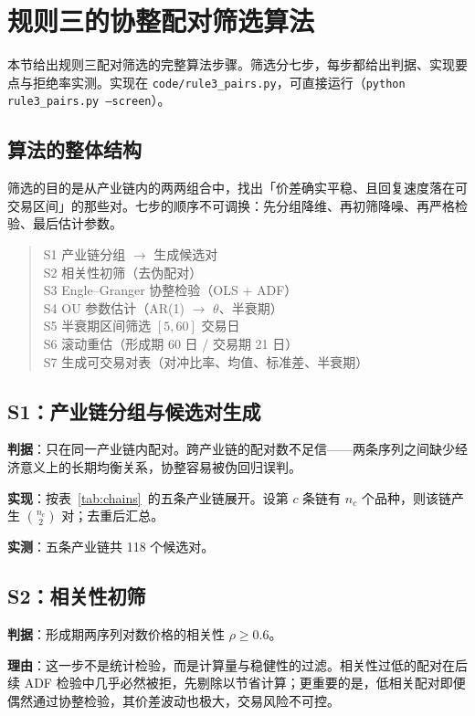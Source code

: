 \section{规则三的协整配对筛选算法}\label{sec:pairalgo}

本节给出规则三配对筛选的完整算法步骤。筛选分七步，每步都给出判据、实现要点与拒绝率实测。实现在 \texttt{code/rule3\_pairs.py}，可直接运行（\texttt{python rule3\_pairs.py --screen}）。

\subsection{算法的整体结构}

筛选的目的是从产业链内的两两组合中，找出「价差确实平稳、且回复速度落在可交易区间」的那些对。七步的顺序不可调换：先分组降维、再初筛降噪、再严格检验、最后估计参数。

\begin{quote}\ttfamily\small
S1 产业链分组 $\to$ 生成候选对\\
S2 相关性初筛（去伪配对）\\
S3 Engle--Granger 协整检验（OLS + ADF）\\
S4 OU 参数估计（AR(1) $\to$ $\theta$、半衰期）\\
S5 半衰期区间筛选 $[5,60]$ 交易日\\
S6 滚动重估（形成期 60 日 / 交易期 21 日）\\
S7 生成可交易对表（对冲比率、均值、标准差、半衰期）
\end{quote}

\subsection{S1：产业链分组与候选对生成}

\textbf{判据}：只在同一产业链内配对。跨产业链的配对数不足信——两条序列之间缺少经济意义上的长期均衡关系，协整容易被伪回归误判。

\textbf{实现}：按表~\ref{tab:chains}~的五条产业链展开。设第 $c$ 条链有 $n_c$ 个品种，则该链产生 $\binom{n_c}{2}$ 对；去重后汇总。

\textbf{实测}：五条产业链共 118 个候选对。

\subsection{S2：相关性初筛}

\textbf{判据}：形成期两序列对数价格的相关性 $\rho\ge0.6$。

\textbf{理由}：这一步不是统计检验，而是计算量与稳健性的过滤。相关性过低的配对在后续 ADF 检验中几乎必然被拒，先剔除以节省计算；更重要的是，低相关配对即便偶然通过协整检验，其价差波动也极大，交易风险不可控。

